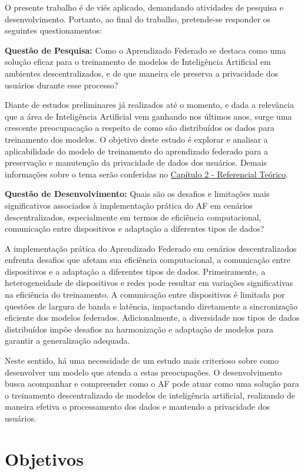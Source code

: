 O presente trabalho é de viés aplicado, demandando atividades de pesquisa e desenvolvimento. Portanto, ao final do trabalho, pretende-se responder os seguintes questionamentos:

\textbf{Questão de Pesquisa:} Como o Aprendizado Federado se destaca como uma solução eficaz para o treinamento de modelos de Inteligência Artificial em ambientes descentralizados, e de que maneira ele preserva a privacidade dos usuários durante esse processo?

Diante de estudos preliminares já realizados até o momento, e dada a relevância que a área de Inteligência Artificial vem ganhando nos últimos anos, surge uma crescente preocupacação a respeito de como são distribuídos os dados para treinamento dos modelos. O objetivo deste estudo é explorar e analisar a aplicabilidade do modelo de treinamento do aprendizado federado para a preservação e manutenção da privacidade de dados dos usuários. Demais informações sobre o tema serão conferidas no \hyperref[chap:teorico]{Capítulo 2 - Referencial Teórico}.

\textbf{Questão de Desenvolvimento:} Quais são os desafios e limitações mais significativos associados à implementação prática do AF em cenários descentralizados, especialmente em termos de eficiência computacional, comunicação entre dispositivos e adaptação a diferentes tipos de dados?

A implementação prática do Aprendizado Federado em cenários descentralizados enfrenta desafios que afetam sua eficiência computacional, a comunicação entre dispositivos e a adaptação a diferentes tipos de dados. Primeiramente, a heterogeneidade de dispositivos e redes pode resultar em variações significativas na eficiência do treinamento. A comunicação entre dispositivos é limitada por questões de largura de banda e latência, impactando diretamente a sincronização eficiente dos modelos federados. Adicionalmente, a diversidade nos tipos de dados distribuídos impõe desafios na harmonização e adaptação de modelos para garantir a generalização adequada.

Neste sentido, há uma necessidade de um estudo mais criterioso sobre como desenvolver um modelo que atenda a estas preocupações. O desenvolvimento busca acompanhar e compreender como o AF pode atuar como uma solução para o treinamento descentralizado de modelos de inteligência artificial, realizando de maneira efetiva o processamento dos dados e mantendo a privacidade dos usuários.

\section{Objetivos}
\label{sec:objetivos}

